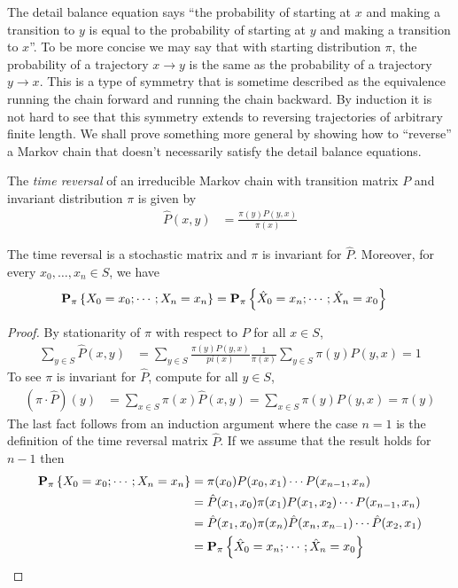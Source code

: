 The detail balance equation says ``the probability of starting at $x$
and making a transition to $y$ is equal to the probability of starting
at $y$ and making a transition to $x$''.  To be more concise we may
say that with starting distribution $\pi$, the probability of a trajectory $x \to y$ is the same as the
probability of a trajectory $y \to x$.  This is a type of symmetry
that is sometime described as the equivalence running the chain
forward and running the chain backward.  By induction it is not hard
to see that this symmetry extends to reversing trajectories of
arbitrary finite length.  We shall prove something more general by
showing how to ``reverse'' a Markov chain that doesn't necessarily
satisfy the detail balance equations.

\begin{defn}The \emph{time reversal} of an irreducible Markov chain
  with transition matrix $P$ and invariant distribution $\pi$ is
  given by 
\begin{align*}
\hat{P}(x,y) &= \frac{\pi(y) P(y,x)}{\pi(x)}
\end{align*}
\end{defn}

\begin{lem}The time reversal is a stochastic matrix and $\pi$ is
  invariant for $\hat{P}$.  Moreover, for every $x_0, \dotsc, x_n \in
  S$, we have
\begin{align*}
\textbf{P}_{\pi} \left \{X_0 = x_0; \dotsb ; X_n = x_n \right \} &=
\textbf{P}_{\pi} \left \{\hat{X}_0 = x_n ; \dotsb ; \hat{X}_n = x_0 \right \}
\end{align*}
\end{lem}
\begin{proof}
By stationarity of $\pi$ with respect to $P$ for all $x \in S$,
\begin{align*}
\sum_{y \in S} \hat{P}(x,y) &=\sum_{y \in S} \frac{\pi(y)
  P(y,x)}{pi(x)} \frac{1}{\pi(x)} \sum_{y \in S} \pi(y)  P(y,x) = 1
\end{align*}
To see $\pi$ is invariant for $\hat{P}$, compute for all $y \in S$,
\begin{align*}
(\pi \cdot \hat{P})(y) &= \sum_{x \in S} \pi(x) \hat{P}(x,y) = \sum_{x
  \in S} \pi(y) P(y,x) =\pi(y)
\end{align*}
The last fact follows from an induction argument where the case $n=1$
is the definition of the time reversal matrix $\hat{P}$.  If we assume
that the result holds for $n-1$ then
\begin{align*}
\textbf{P}_{\pi} \left \{X_0 = x_0; \dotsb ; X_n = x_n \right \}  &= \pi(x_0) P(x_0,
x_1) \dotsb P(x_{n-1}, x_n) \\
&= \hat{P}(x_1, x_0) \pi(x_1) P(x_1, x_2) \dotsb P(x_{n-1},x_n) \\
&= \hat{P}(x_1, x_0) \pi(x_n) \hat{P}(x_n, x_{n-1}) \dotsb \hat{P}
(x_2,x_1) \\
&= \textbf{P}_{\pi} \left \{\hat{X}_0 = x_n ; \dotsb ; \hat{X}_n = x_0 \right \}
\end{align*}
\end{proof}


